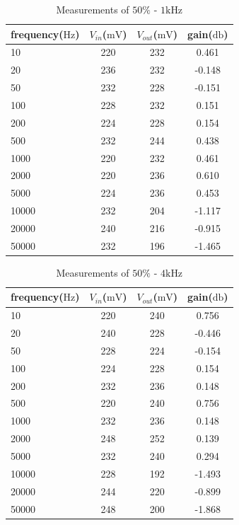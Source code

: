 \begin{table}[!htbp]
	\centering
	\caption{Measurements of $50\%$ - $1\si{\kilo\hertz}$}
	\label{tab:data11}
	\begin{tabular}{lccc}
		\toprule
		frequency($\si{\hertz}$) & $V_{in}$($\si{\milli\volt}$) & $V_{out}$($\si{\milli\volt}$) & gain($\si{\decibel}$) \\
		\midrule
		10&	220&	232&	0.461\\
		20&	236&	232&	-0.148\\
		50&	232&	228&	-0.151\\
		100&	228&	232&	0.151\\
		200&	224&	228&	0.154\\
		500&	232&	244&	0.438\\
		1000&	220&	232&	0.461\\
		2000&	220&	236&	0.610\\
		5000&	224&	236&	0.453\\
		10000&	232&	204&	-1.117\\
		20000&	240&	216&	-0.915\\
		50000&	232&	196&	-1.465\\
		\bottomrule
	\end{tabular}
\end{table}

\begin{table}[!htbp]
	\centering
	\caption{Measurements of $50\%$ - $4\si{\kilo\hertz}$}
	\label{tab:data12}
	\begin{tabular}{lccc}
		\toprule
		frequency($\si{\hertz}$) & $V_{in}$($\si{\milli\volt}$) & $V_{out}$($\si{\milli\volt}$) & gain($\si{\decibel}$) \\
		\midrule
		10&	220&	240&	0.756\\
		20&	240&	228&	-0.446\\
		50&	228&	224&	-0.154\\
		100&	224&	228&	0.154\\
		200&	232&	236&	0.148\\
		500&	220&	240&	0.756\\
		1000&	232&	236&	0.148\\
		2000&	248&	252&	0.139\\
		5000&	232&	240&	0.294\\
		10000&	228&	192&	-1.493\\
		20000&	244&	220&	-0.899\\
		50000&	248&	200&	-1.868\\
		\bottomrule
	\end{tabular}
\end{table}


